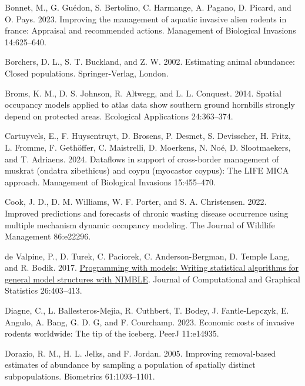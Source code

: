 \documentclass[
  11pt,
  a4paper,
]{article}
\newlength{\cslhangindent}
\newenvironment{CSLReferences}[2] %
 {\begin{list}{}{%
  \setlength{\itemindent}{0pt}
  \setlength{\leftmargin}{0pt}
  \setlength{\parsep}{0pt}
  \ifodd #1
   \setlength{\leftmargin}{\cslhangindent}
   \setlength{\itemindent}{-1\cslhangindent}
  \fi
  \setlength{\itemsep}{#2\baselineskip}}}
 {\end{list}}
\begin{document}
\label{refs}
\begin{CSLReferences}{1}{0}
Bonnet, M., G. Guédon, S. Bertolino, C. Harmange, A. Pagano, D. Picard, and O. Pays. 2023. Improving the management of aquatic invasive alien rodents in france: Appraisal and recommended actions. Management of Biological Invasions 14:625--640.

Borchers, D. L., S. T. Buckland, and Z. W. 2002. Estimating animal abundance: Closed populations. Springer-Verlag, London.

Broms, K. M., D. S. Johnson, R. Altwegg, and L. L. Conquest. 2014. Spatial occupancy models applied to atlas data show southern ground hornbills strongly depend on protected areas. Ecological Applications 24:363--374.

Cartuyvels, E., F. Huysentruyt, D. Brosens, P. Desmet, S. Devisscher, H. Fritz, L. Fromme, F. Gethöffer, C. Maistrelli, D. Moerkens, N. Noé, D. Slootmaekers, and T. Adriaens. 2024. Dataflows in support of cross-border management of muskrat (ondatra zibethicus) and coypu (myocastor coypus): The LIFE MICA approach. Management of Biological Invasions 15:455--470.

Cook, J. D., D. M. Williams, W. F. Porter, and S. A. Christensen. 2022. Improved predictions and forecasts of chronic wasting disease occurrence using multiple mechanism dynamic occupancy modeling. The Journal of Wildlife Management 86:e22296.

de Valpine, P., D. Turek, C. Paciorek, C. Anderson-Bergman, D. Temple Lang, and R. Bodik. 2017. \href{https://doi.org/10.1080/10618600.2016.1172487}{Programming with models: Writing statistical algorithms for general model structures with {NIMBLE}}. Journal of Computational and Graphical Statistics 26:403--413.

Diagne, C., L. Ballesteros-Mejia, R. Cuthbert, T. Bodey, J. Fantle-Lepczyk, E. Angulo, A. Bang, G. D. G, and F. Courchamp. 2023. Economic costs of invasive rodents worldwide: The tip of the iceberg. PeerJ 11:e14935.

Dorazio, R. M., H. L. Jelks, and F. Jordan. 2005. Improving removal-based estimates of abundance by sampling a population of spatially distinct subpopulations. Biometrics 61:1093--1101.


\end{CSLReferences}
\end{document}
